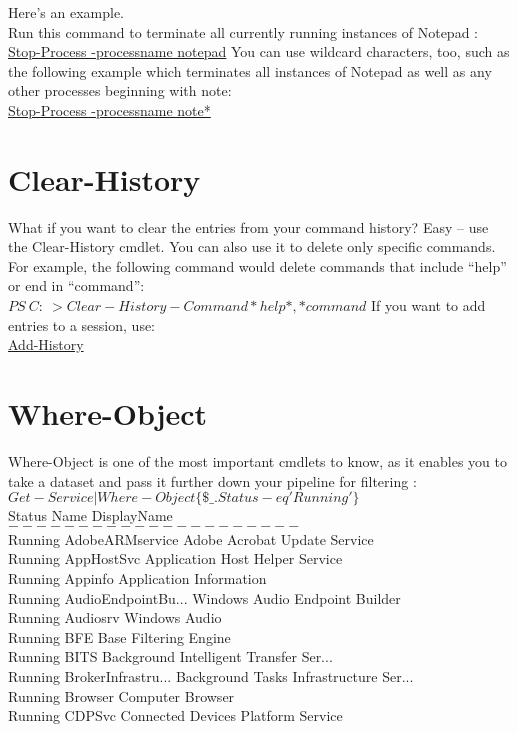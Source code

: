 \documentclass[12pt]{article}
\begin{document}
Here’s an example.\\
Run this command to terminate all currently running instances of Notepad :\\

\underline{Stop-Process -processname notepad}
You can use wildcard characters, too, such as the following example which terminates all instances of Notepad as well as any other processes beginning with note:\\

\underline{Stop-Process -processname note*}

\section{Clear-History}

What if you want to clear the entries from your command history? Easy – use the Clear-History cmdlet. You can also use it to delete only specific commands. For example, the following command would delete commands that include “help” or end in “command”:\\

$PS \ C:\ > Clear-History -Command *help*, *command$
If you want to add entries to a session, use: \\

\underline{Add-History}
\section{Where-Object}
Where-Object is one of the most important cmdlets to know, as it enables you to take a dataset and pass it further down your pipeline for filtering :\\

$Get-Service | Where-Object \{\$\_.Status -eq 'Running'\}$ \\

Status Name DisplayName \\
$------ ---- -----------$\\
Running AdobeARMservice Adobe Acrobat Update Service\\
Running AppHostSvc Application Host Helper Service\\
Running Appinfo Application Information\\
Running AudioEndpointBu... Windows Audio Endpoint Builder\\
Running Audiosrv Windows Audio\\
Running BFE Base Filtering Engine\\
Running BITS Background Intelligent Transfer Ser...\\
Running BrokerInfrastru... Background Tasks Infrastructure Ser...\\
Running Browser Computer Browser\\
Running CDPSvc Connected Devices Platform Service\\
\end{document}
